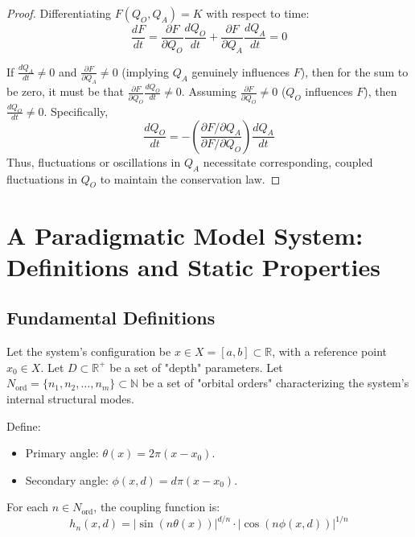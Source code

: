 \documentclass[11pt,a4paper]{article}
\begin{document}
\begin{proof}
Differentiating $F(Q_O, Q_A) = K$ with respect to time:
\begin{equation}
    \frac{dF}{dt} = \frac{\partial F}{\partial Q_O}\frac{dQ_O}{dt} + \frac{\partial F}{\partial Q_A}\frac{dQ_A}{dt} = 0
\end{equation}

If $\frac{dQ_A}{dt} \neq 0$ and $\frac{\partial F}{\partial Q_A} \neq 0$ (implying $Q_A$ genuinely influences $F$), then for the sum to be zero, it must be that $\frac{\partial F}{\partial Q_O}\frac{dQ_O}{dt} \neq 0$. Assuming $\frac{\partial F}{\partial Q_O} \neq 0$ ($Q_O$ influences $F$), then $\frac{dQ_O}{dt} \neq 0$. Specifically,
\begin{equation}
    \frac{dQ_O}{dt} = - \left(\frac{\partial F/\partial Q_A}{\partial F/\partial Q_O}\right) \frac{dQ_A}{dt}
\end{equation}
Thus, fluctuations or oscillations in $Q_A$ necessitate corresponding, coupled fluctuations in $Q_O$ to maintain the conservation law.
\end{proof}

\section{A Paradigmatic Model System: Definitions and Static Properties}

\subsection{Fundamental Definitions}
Let the system's configuration be $x \in X = [a,b] \subset \mathbb{R}$, with a reference point $x_0 \in X$.
Let $D \subset \mathbb{R}^+$ be a set of "depth" parameters.
Let $N_{\text{ord}} = \{n_1, n_2, \dots, n_m\} \subset \mathbb{N}$ be a set of "orbital orders" characterizing the system's internal structural modes.

Define:
\begin{itemize}
    \item Primary angle: $\theta(x) = 2\pi(x - x_0)$.
    \item Secondary angle: $\phi(x,d) = d\pi(x - x_0)$.
\end{itemize}

For each $n \in N_{\text{ord}}$, the coupling function is:
\begin{equation}
    h_n(x,d) = |\sin(n\theta(x))|^{d/n} \cdot |\cos(n\phi(x,d))|^{1/n}
\end{equation}
\end{document}
